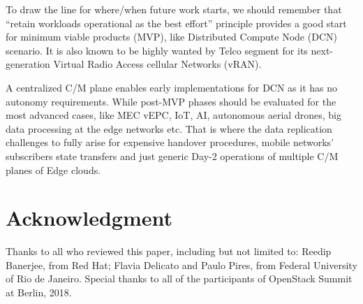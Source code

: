 \documentclass[conference]{IEEEtran}
\begin{document}
To draw the line for where/when future work starts, we should remember
that ``retain workloads operational as the best effort'' principle provides a
good start for minimum viable products (MVP), like Distributed Compute Node
(DCN) scenario. It is also known to be highly wanted by Telco segment for its
next-generation Virtual Radio Access cellular Networks (vRAN).

A centralized C/M plane enables early implementations for DCN as it has no
autonomy requirements. While post-MVP phases should be evaluated for the most
advanced cases, like MEC vEPC, IoT, AI, autonomous aerial drones, big data
processing at the edge networks etc. That is where the data replication
challenges to fully arise for expensive handover procedures, mobile networks'
subscribers state transfers and just generic Day-2 operations of multiple
C/M planes of Edge clouds.

\section*{Acknowledgment}
Thanks to all who reviewed this paper, including but not limited to:
Reedip Banerjee, from Red Hat; Flavia Delicato and Paulo Pires, from Federal
University of Rio de Janeiro. Special thanks to all of the participants of
OpenStack Summit at Berlin, 2018.
\end{document}
